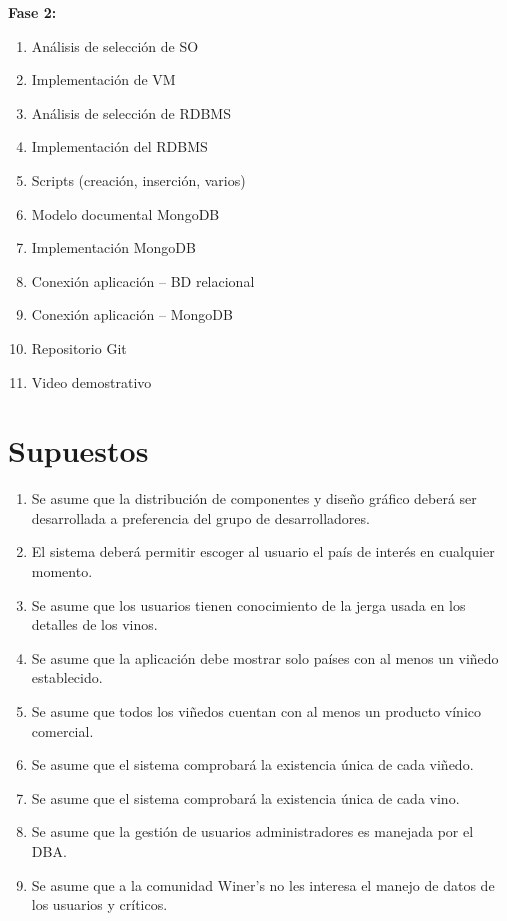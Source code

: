 \documentclass[12pt, a4paper]{article}
\begin{document}
\textbf{Fase 2:}
\begin{enumerate}[leftmargin=2cm]
    \item Análisis de selección de SO
    \item Implementación de VM
    \item Análisis de selección de RDBMS
    \item Implementación del RDBMS
    \item Scripts (creación, inserción, varios)
    \item Modelo documental MongoDB
    \item Implementación MongoDB
    \item Conexión aplicación -- BD relacional
    \item Conexión aplicación -- MongoDB
    \item Repositorio Git
    \item Video demostrativo
\end{enumerate}


\section{Supuestos}

\begin{enumerate}[leftmargin=2cm]
    \item Se asume que la distribución de componentes y diseño gráfico deberá ser desarrollada a preferencia del grupo de desarrolladores.
    \item El sistema deberá permitir escoger al usuario el país de interés en cualquier momento.
    \item Se asume que los usuarios tienen conocimiento de la jerga usada en los detalles de los vinos.
    \item Se asume que la aplicación debe mostrar solo países con al menos un viñedo establecido.
    \item Se asume que todos los viñedos cuentan con al menos un producto vínico comercial.
    \item Se asume que el sistema comprobará la existencia única de cada viñedo.
    \item Se asume que el sistema comprobará la existencia única de cada vino.
    \item Se asume que la gestión de usuarios administradores es manejada por el DBA.
    \item Se asume que a la comunidad Winer's no les interesa el manejo de datos de los usuarios y críticos.
\end{enumerate}
\end{document}
